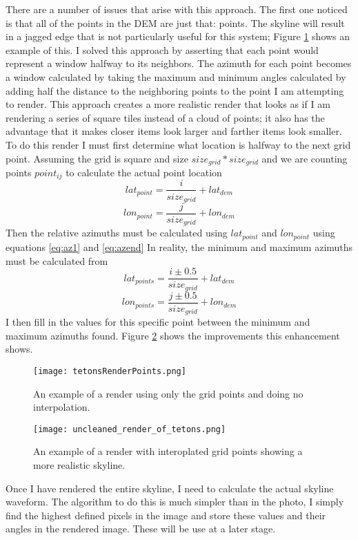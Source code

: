 \documentclass{acm_proc_article-sp}
\begin{document}
There are a number of issues that arise with this approach.  The first one noticed is that all of the points in the DEM are just that: points.  The skyline will result in a jagged edge that is not particularly useful for this system; Figure \ref{fig:tetPoints} shows an example of this.  I solved this approach by asserting that each point would represent a window halfway to its neighbors.  The azimuth for each point becomes a window calculated by taking the maximum and minimum angles calculated by adding half the distance to the neighboring points to the point I am attempting to render.  This approach creates a more realistic render that looks as if I am rendering a series of square tiles instead of a cloud of points; it also has the advantage that it makes closer items look larger and farther items look smaller. To do this render I must first determine what location is halfway to the next grid point.  Assuming the grid is square and size $size_{grid} * size_{grid}$ and we are counting points $point_{ij}$  to calculate the actual point location
\begin{equation}
	lat_{point} = \frac{i}{size_{grid}}+lat_{dem}
\end{equation}
\begin{equation}
	lon_{point} = \frac{j}{size_{grid}}+lon_{dem}
\end{equation}
Then the relative azimuths must be calculated using $lat_{point}$ and $lon_{point}$ using equations \ref{eq:az1} and \ref{eq:azend}
In reality, the minimum and maximum azimuths must be calculated from
\begin{equation}
	lat_{points} = \frac{i\pm0.5}{size_{grid}}+lat_{dem}
\end{equation}
\begin{equation}
	lon_{points} = \frac{j\pm0.5}{size_{grid}}+lon_{dem}
\end{equation}
  I then fill in the values for this specific point between the minimum and maximum azimuths found. Figure \ref{fig:tetGood} shows the improvements this enhancement shows.

\begin{figure}
	\centering
	\texttt{[image: tetonsRenderPoints.png]}
	\caption{An example of a render using only the grid points and doing no interpolation.}
	\label{fig:tetPoints}
\end{figure}
\begin{figure}
	\centering
	\texttt{[image: uncleaned\_render\_of\_tetons.png]}
	\caption{An example of a render with interoplated grid points showing a more realistic skyline.}
	\label{fig:tetGood}
\end{figure}
    Once I have rendered the entire skyline, I need to calculate the actual skyline waveform.  The algorithm to do this is much simpler than in the photo, I simply find the highest defined pixels in the image and store these values and their angles in the rendered image. These will be use at a later stage.
\end{document}
